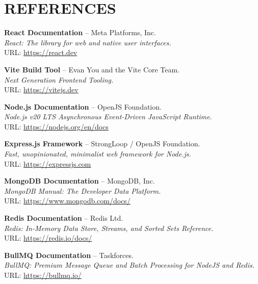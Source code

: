 \documentclass[12pt,a4paper]{report}
\begin{document}
\clearpage

\chapter{REFERENCES}

\begin{enumerate}[leftmargin=*, label={[\arabic*]}]
  \item \textbf{React Documentation} -- Meta Platforms, Inc. \\
  \textit{React: The library for web and native user interfaces.} \\
  URL: \url{https://react.dev}

  \item \textbf{Vite Build Tool} -- Evan You and the Vite Core Team. \\
  \textit{Next Generation Frontend Tooling.} \\
  URL: \url{https://vitejs.dev}

  \item \textbf{Node.js Documentation} -- OpenJS Foundation. \\
  \textit{Node.js v20 LTS Asynchronous Event-Driven JavaScript Runtime.} \\
  URL: \url{https://nodejs.org/en/docs}

  \item \textbf{Express.js Framework} -- StrongLoop / OpenJS Foundation. \\
  \textit{Fast, unopinionated, minimalist web framework for Node.js.} \\
  URL: \url{https://expressjs.com}

  \item \textbf{MongoDB Documentation} -- MongoDB, Inc. \\
  \textit{MongoDB Manual: The Developer Data Platform.} \\
  URL: \url{https://www.mongodb.com/docs/}

  \item \textbf{Redis Documentation} -- Redis Ltd. \\
  \textit{Redis: In-Memory Data Store, Streams, and Sorted Sets Reference.} \\
  URL: \url{https://redis.io/docs/}

  \item \textbf{BullMQ Documentation} -- Taskforces. \\
  \textit{BullMQ: Premium Message Queue and Batch Processing for NodeJS and Redis.} \\
  URL: \url{https://bullmq.io/}


\end{enumerate}
\end{document}
